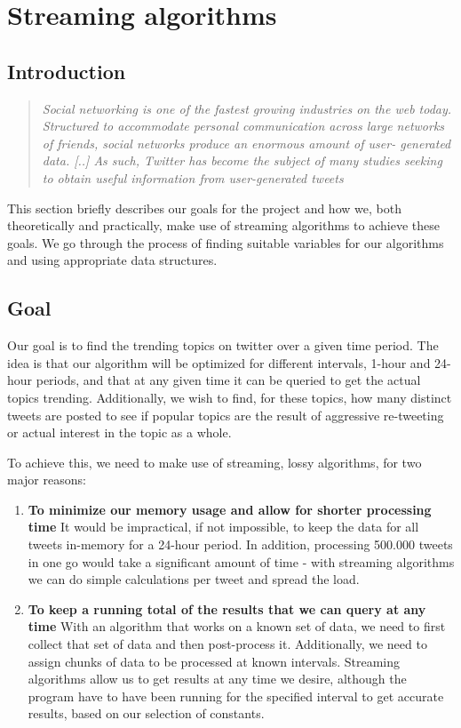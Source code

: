 \section{Streaming algorithms}\label{related work}
\subsection{Introduction}\label{algo-intro}

\begin{quote}\textit{
Social networking is one of the fastest growing industries on the web today. Structured to accommodate personal communication across large networks of friends, social networks produce an enormous amount of user- generated data. [..] As such, Twitter has become the subject of many studies seeking to obtain useful information from user-generated tweets \cite{genderprediction}  
}
\end{quote}

This section briefly describes our goals for the project and how we, both theoretically and practically, make use of streaming algorithms to achieve these goals. We go through the process of finding suitable variables for our algorithms and using appropriate data structures.

\subsection{Goal}\label{algo-goals}
Our goal is to find the trending topics on twitter over a given time period. The idea is that our algorithm will be optimized for different intervals, 1-hour and 24-hour periods, and that at any given time it can be queried to get the actual topics trending. Additionally, we wish to find, for these topics, how many distinct tweets are posted to see if popular topics are the result of aggressive re-tweeting or actual interest in the topic as a whole.

To achieve this, we need to make use of streaming, lossy algorithms, for two major reasons:
\begin{enumerate}
    \item \textbf{To minimize our memory usage and allow for shorter processing time}
        It would be impractical, if not impossible, to keep the data for all tweets in-memory for a 24-hour period. In addition, processing 500.000 tweets in one go would take a significant amount of time - with streaming algorithms we can do simple calculations per tweet and spread the load.

    \item \textbf{To keep a running total of the results that we can query at any time}
        With an algorithm that works on a known set of data, we need to first collect that set of data and then post-process it. Additionally, we need to assign chunks of data to be processed at known intervals. Streaming algorithms allow us to get results at any time we desire, although the program have to have been running for the specified interval to get accurate results, based on our selection of constants.
\end{enumerate}

